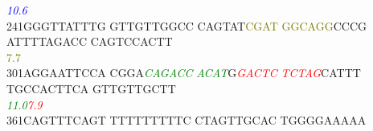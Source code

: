 \documentclass[11pt,twoside,reqno,a4paper]{article}
\begin{document}
{\hspace*{4\charwidth}\hspace*{1\charwidth}\hspace*{1\charwidth}\hspace*{1\charwidth}\hspace*{1\charwidth}\hspace*{43\charwidth}\textit{\textcolor{blue}{10.6}}\hspace*{1\charwidth}\hspace*{1\charwidth}\\
241\hspace*{1\charwidth}GGGTTATTTG	GTTGTTGGCC	CAGTAT\textcolor{olive}{C}\textcolor{olive}{G}\textcolor{olive}{A}\textcolor{olive}{T}	\textcolor{olive}{G}\textcolor{olive}{G}\textcolor{olive}{C}\textcolor{olive}{A}\textcolor{olive}{G}\textcolor{olive}{G}CCCG	ATTTTAGACC	CAGTCCACTT	\\
\hspace*{4\charwidth}\hspace*{1\charwidth}\hspace*{1\charwidth}\hspace*{26\charwidth}\textcolor{olive}{7.7}\hspace*{1\charwidth}\hspace*{1\charwidth}\hspace*{1\charwidth}\hspace*{1\charwidth}\\
301\hspace*{1\charwidth}AGGAATTCCA	CGGA\textit{\textcolor{green}{C}}\textit{\textcolor{green}{A}}\textit{\textcolor{green}{G}}\textit{\textcolor{green}{A}}\textit{\textcolor{green}{C}}\textit{\textcolor{green}{C}}	\textit{\textcolor{green}{A}}\textit{\textcolor{green}{C}}\textit{\textcolor{green}{A}}\textit{\textcolor{green}{T}}G\textit{\textcolor{red}{G}}\textit{\textcolor{red}{A}}\textit{\textcolor{red}{C}}\textit{\textcolor{red}{T}}\textit{\textcolor{red}{C}}	\textit{\textcolor{red}{T}}\textit{\textcolor{red}{C}}\textit{\textcolor{red}{T}}\textit{\textcolor{red}{A}}\textit{\textcolor{red}{G}}CATTT	TGCCACTTCA	GTTGTTGCTT	\\
\hspace*{4\charwidth}\hspace*{1\charwidth}\hspace*{14\charwidth}\textit{\textcolor{green}{11.0}}\hspace*{1\charwidth}\hspace*{7\charwidth}\textit{\textcolor{red}{7.9}}\hspace*{1\charwidth}\hspace*{1\charwidth}\hspace*{1\charwidth}\hspace*{1\charwidth}\\
361\hspace*{1\charwidth}CAGTTTCAGT	TTTTTTTTTC	CTAGTTGCAC	TGGGGAAAAA	\\
\hspace*{4\charwidth}\hspace*{1\charwidth}\hspace*{1\charwidth}\hspace*{1\charwidth}\hspace*{1\charwidth}\\
}
\end{document}
